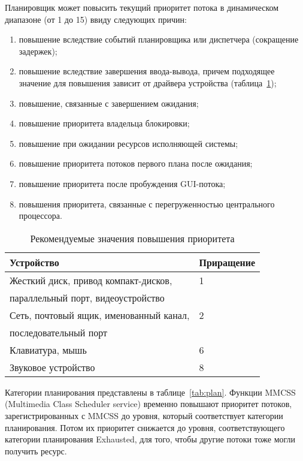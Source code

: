 \documentclass{bmstu}
\begin{document}
Планировщик может повысить текущий приоритет потока в динамическом диапазоне (от 1 до 15) ввиду следующих причин:
\begin{enumerate}
\item[1)] повышение вследствие событий планировщика или диспетчера (сокращение задержек);
\item[2)] повышение вследствие завершения ввода-вывода, причем подходящее значение для повышения зависит от драйвера устройства (таблица~\ref{tab:prority});
\item[3)] повышение, связанные с завершением ожидания;
\item[4)] повышение приоритета владельца блокировки;
\item[5)] повышение при ожидании ресурсов исполняющей системы;
\item[6)] повышение приоритета потоков первого плана после ожидания;
\item[7)] повышение приоритета после пробуждения GUI-потока;
\item[8)] повышения приоритета, связанные с перегруженностью центрального процессора.
\end{enumerate}

\begin{table}[h]
\caption{Рекомендуемые значения повышения приоритета}
\label{tab:prority}
\begin{center}
\begin{tabular}{ | l | l | }
			\hline
			\textbf{Устройство} & \textbf{Приращение} \\ \hline
			Жесткий диск, привод компакт-дисков, & 1 \\ параллельный порт, видеоустройство & \\ \hline
            
            Сеть, почтовый ящик, именованный канал, & 2 \\ последовательный порт & \\ \hline
			Клавиатура, мышь & 6 \\ \hline
			Звуковое устройство & 8 \\ \hline
\end{tabular}
\end{center}
\end{table}

\pagebreak
Категории планирования представлены в таблице~\ref{tab:plan}. 
Функции MMCSS (Multimedia Class Scheduler service) временно повышают приоритет потоков, зарегистрированных с MMCSS до уровня, который соответствует категории планирования. 
Потом их приоритет снижается до уровня, соответствующего категории планирования Exhausted, для того, чтобы другие потоки тоже могли получить ресурс.
\end{document}
